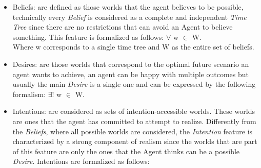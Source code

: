 \documentclass[a4paper]{article}
\begin{document}
\begin{itemize}

\item Beliefs: are defined as those worlds that the agent believes to be possible, technically every \textit{Belief} is considered as a complete and independent \textit{Time Tree} since there are no restrictions that can avoid an Agent to believe something. This feature is formalized as follows: $\forall$ w $\in$ W. \\
Where w corresponds to a single time tree and W as the entire set of beliefs. 
\item Desires: are those worlds that correspond to the optimal future scenario an agent wants to achieve, an agent can be happy with multiple outcomes but usually the main \textit{Desire} is a single one and can be expressed by the following formalism: $\exists!$ w $\in$ W.  
\item Intentions: are considered as sets of intention-accessible worlds. These worlds are ones that the agent has committed to attempt to realize. Differently from the \textit{Beliefs}, where all possible worlds are considered, the \textit{Intention} feature is characterized by a strong component of realism since the worlds that are part of this feature are only the ones that the Agent thinks can be a possible \textit{Desire}. Intentions are formalized as follows:

\end{itemize} 
\end{document}
